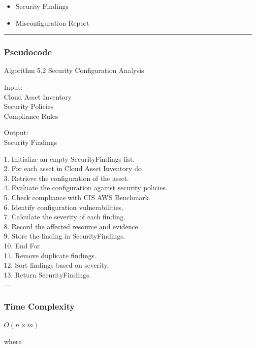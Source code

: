 \begin{itemize}
\tightlist
\item
  Security Findings\\
\item
  Misconfiguration Report
\end{itemize}

\begin{center}\rule{0.5\linewidth}{0.5pt}\end{center}

\subsubsection{Pseudocode}

Algorithm 5.2 Security Configuration Analysis

Input:\\
Cloud Asset Inventory\\
Security Policies\\
Compliance Rules

Output:\\
Security Findings

1. Initialize an empty SecurityFindings list.\\
2. For each asset in Cloud Asset Inventory do\\
3. Retrieve the configuration of the asset.\\
4. Evaluate the configuration against security policies.\\
5. Check compliance with CIS AWS Benchmark.\\
6. Identify configuration vulnerabilities.\\
7. Calculate the severity of each finding.\\
8. Record the affected resource and evidence.\\
9. Store the finding in SecurityFindings.\\
10. End For\\
11. Remove duplicate findings.\\
12. Sort findings based on severity.\\
13. Return SecurityFindings.\\
---

\subsubsection{Time Complexity}

$O(n \times m)$

where

